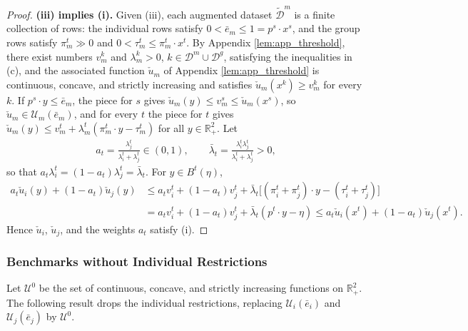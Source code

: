 \documentclass[11 pt]{article}
\begin{document}
\begin{proof}
\textbf{(iii) implies (i).} Given (iii), each augmented dataset $\widetilde{\mathcal{D}}^{m}$ is a finite collection of rows: the individual rows satisfy $0 < \bar e_{m} \leq 1 = p^{s} \cdot x^{s}$, and the group rows satisfy $\pi_{m}^{t} \gg 0$ and $0 < \tau_{m}^{t} \leq \pi_{m}^{t} \cdot x^{t}$. By Appendix \autoref{lem:app_threshold}, there exist numbers $v_{m}^{k}$ and $\lambda_{m}^{k} > 0$, $k \in \mathcal{D}^{m} \cup \mathcal{D}^{g}$, satisfying the inequalities in (c), and the associated function $\check u_{m}$ of Appendix \autoref{lem:app_threshold} is continuous, concave, and strictly increasing and satisfies $\check u_{m}(x^{k}) \geq v_{m}^{k}$ for every $k$. If $p^{s} \cdot y \leq \bar e_{m}$, the piece for $s$ gives $\check u_{m}(y) \leq v_{m}^{s} \leq \check u_{m}(x^{s})$, so $\check u_{m} \in \mathcal{U}_{m}(\bar e_{m})$, and for every $t$ the piece for $t$ gives $\check u_{m}(y) \leq v_{m}^{t} + \lambda_{m}^{t} (\pi_{m}^{t} \cdot y - \tau_{m}^{t})$ for all $y \in \mathbb{R}^{2}_{+}$. Let
\begin{align*}
a_{t} = \frac{\lambda_{j}^{t}}{\lambda_{i}^{t} + \lambda_{j}^{t}} \in (0,1), \qquad
\bar \lambda_{t} = \frac{\lambda_{i}^{t} \lambda_{j}^{t}}{\lambda_{i}^{t} + \lambda_{j}^{t}} > 0,
\end{align*}
so that $a_{t} \lambda_{i}^{t} = (1 - a_{t}) \lambda_{j}^{t} = \bar \lambda_{t}$. For $y \in B^{t}(\eta)$,
\begin{align*}
a_{t} \check u_{i}(y) + (1-a_{t}) \check u_{j}(y)
&\leq a_{t} v_{i}^{t} + (1-a_{t}) v_{j}^{t} + \bar \lambda_{t} \bigl[ (\pi_{i}^{t} + \pi_{j}^{t}) \cdot y - (\tau_{i}^{t} + \tau_{j}^{t}) \bigr] \\
&= a_{t} v_{i}^{t} + (1-a_{t}) v_{j}^{t} + \bar \lambda_{t} ( p^{t} \cdot y - \eta )
\leq a_{t} \check u_{i}(x^{t}) + (1-a_{t}) \check u_{j}(x^{t}).
\end{align*}
Hence $\check u_{i}$, $\check u_{j}$, and the weights $a_{t}$ satisfy (i).
\end{proof}

\subsubsection{Benchmarks without Individual Restrictions}\label{subsec:app_unrestricted}

Let $\mathcal{U}^{0}$ be the set of continuous, concave, and strictly increasing functions on $\mathbb{R}^{2}_{+}$. The following result drops the individual restrictions, replacing $\mathcal{U}_{i}(\bar e_{i})$ and $\mathcal{U}_{j}(\bar e_{j})$ by $\mathcal{U}^{0}$.
\end{document}
